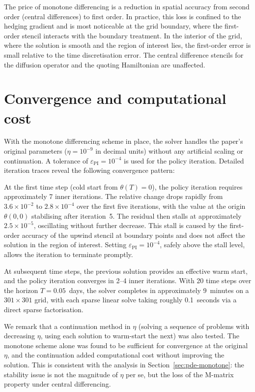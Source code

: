 The price of monotone differencing is a reduction in spatial accuracy from second order (central differences) to first order. In practice, this loss is confined to the hedging gradient and is most noticeable at the grid boundary, where the first-order stencil interacts with the boundary treatment. In the interior of the grid, where the solution is smooth and the region of interest lies, the first-order error is small relative to the time discretisation error. The central difference stencils for the diffusion operator and the quoting Hamiltonian are unaffected.


\section{Convergence and computational cost}
\label{sec:pde-convergence}

With the monotone differencing scheme in place, the solver handles the paper's original parameters ($\eta = 10^{-9}$ in decimal units) without any artificial scaling or continuation. A tolerance of $\varepsilon_{\text{PI}} = 10^{-4}$ is used for the policy iteration. Detailed iteration traces reveal the following convergence pattern:

At the first time step (cold start from $\theta(T) = 0$), the policy iteration requires approximately 7 inner iterations. The relative change drops rapidly from $3.6 \times 10^{-2}$ to $2.8 \times 10^{-4}$ over the first five iterations, with the value at the origin $\theta(0,0)$ stabilising after iteration~5. The residual then stalls at approximately $2.5 \times 10^{-5}$, oscillating without further decrease. This stall is caused by the first-order accuracy of the upwind stencil at boundary points and does not affect the solution in the region of interest. Setting $\varepsilon_{\text{PI}} = 10^{-4}$, safely above the stall level, allows the iteration to terminate promptly.

At subsequent time steps, the previous solution provides an effective warm start, and the policy iteration converges in 2--4 inner iterations. With 20 time steps over the horizon $T = 0.05$~days, the solver completes in approximately 9~minutes on a $301 \times 301$ grid, with each sparse linear solve taking roughly 0.1~seconds via a direct sparse factorisation.

We remark that a continuation method in $\eta$ (solving a sequence of problems with decreasing $\eta$, using each solution to warm-start the next) was also tested. The monotone scheme alone was found to be sufficient for convergence at the original $\eta$, and the continuation added computational cost without improving the solution. This is consistent with the analysis in Section~\ref{sec:pde-monotone}: the stability issue is not the magnitude of $\eta$ per se, but the loss of the M-matrix property under central differencing.


